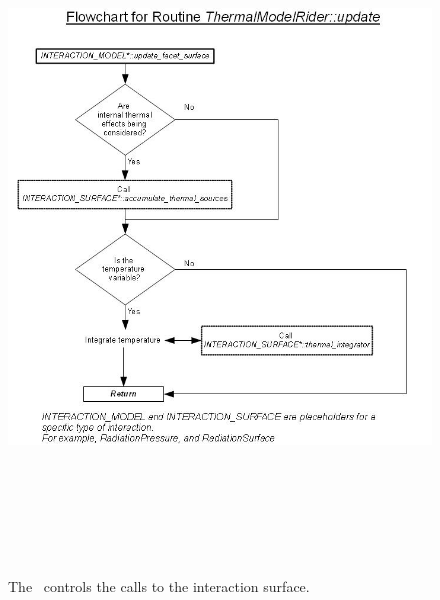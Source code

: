 \begin{figure}[htp]
\begin{center}
\includegraphics[height=7.2in]{figures/flow_chart_tmr_update.jpg}
\caption{The \ThermalRiderDesc\ controls the calls to the
interaction surface.}
\label{fig:thermalflowchart1a}
\end{center}
\end{figure}


